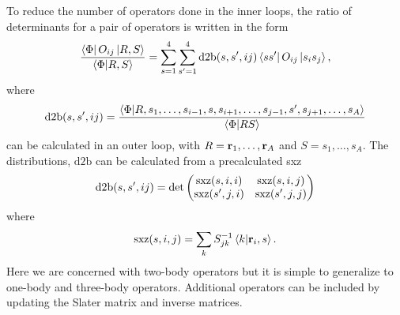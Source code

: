 To reduce the number of operators done in the inner loops, the ratio of determinants for a pair of operators is written in the form
\begin{equation}
   \frac{\left< \Phi \right|O_{ij}\left| R,S \right>}{\left< \Phi | R,S \right>} = \sum\limits_{s=1}^4\sum\limits_{s'=1}^4 \mathrm{d2b}(s,s',ij)\left< ss' \right|O_{ij}\left| s_is_j \right>,
\end{equation}
where
\begin{equation}
   \mathrm{d2b}(s,s',ij)=\frac{\left< \Phi | R,s_1,\ldots,s_{i-1},s,s_{i+1},\ldots,s_{j-1},s',s_{j+1},\ldots,s_A \right>}{\left< \Phi | RS \right>}
\end{equation}
can be calculated in an outer loop, with $R=\mathbf{r}_1,\ldots,\mathbf{r}_A$ and $S=s_1,\ldots,s_A$. The distributions, $\mathrm{d2b}$ can be calculated from a precalculated sxz
\begin{equation}
   \mathrm{d2b}(s,s',ij) = \mathrm{det}\begin{pmatrix}\mathrm{sxz}(s,i,i)&\mathrm{sxz}(s,i,j)\\\mathrm{sxz}(s',j,i)&\mathrm{sxz}(s',j,j)\end{pmatrix}
\end{equation}
where
\begin{equation}
   \mathrm{sxz}(s,i,j)=\sum\limits_k S^{-1}_{jk}\left< k | \mathbf{r}_i,s \right>.
\end{equation}
Here we are concerned with two-body operators but it is simple to generalize to one-body and three-body operators. Additional operators can be included by updating the Slater matrix and inverse matrices.

